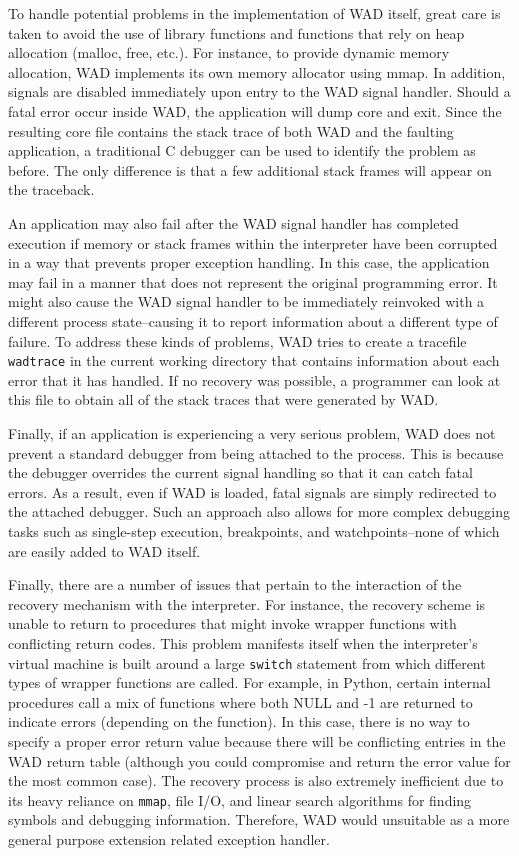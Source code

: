 To handle potential problems in the implementation of WAD itself,
great care is taken to avoid the use of library functions and
functions that rely on heap allocation (malloc, free, etc.).  For
instance, to provide dynamic memory allocation, WAD implements its own
memory allocator using mmap.  In addition, signals are disabled
immediately upon entry to the WAD signal handler.  Should a fatal
error occur inside WAD, the application will dump core and exit.  Since
the resulting core file contains the stack trace of both WAD and the
faulting application, a traditional C debugger can be used to identify
the problem as before.  The only difference is that a few additional
stack frames will appear on the traceback.

An application may also fail after the WAD signal handler has completed
execution if memory or stack frames within the interpreter have been
corrupted in a way that prevents proper exception handling. In this case, the
application may fail in a manner that does not represent the original
programming error. It might also cause the WAD signal handler to be
immediately reinvoked with a different process state--causing it to
report information about a different type of failure.  To address
these kinds of problems, WAD tries to create a tracefile {\tt
wadtrace} in the current working directory that contains information
about each error that it has handled.  If no recovery was possible, a
programmer can look at this file to obtain all of the stack traces
that were generated by WAD.

Finally, if an application is experiencing a very serious problem, WAD
does not prevent a standard debugger from being attached to the
process.  This is because the debugger overrides the current signal
handling so that it can catch fatal errors.  As a result, even if WAD
is loaded, fatal signals are simply redirected to the attached
debugger.  Such an approach also allows for more complex debugging
tasks such as single-step execution, breakpoints, and
watchpoints--none of which are easily added to WAD itself.

%
%

Finally, there are a number of issues that pertain
to the interaction of the recovery mechanism with the interpreter.
For instance, the recovery scheme is unable to return to procedures
that might invoke wrapper functions with conflicting return codes.
This problem manifests itself when the interpreter's virtual
machine is built around a large {\tt switch} statement from which different
types of wrapper functions are called.  For example, in Python, certain
internal procedures call a mix of functions where both NULL and -1 are
returned to indicate errors (depending on the function).  In this case, there
is no way to specify a proper error return value because there will be
conflicting entries in the WAD return table (although you could compromise and
return the error value for the most common case).   The recovery
process is also extremely inefficient due to its heavy reliance on
{\tt mmap}, file I/O, and linear search algorithms for finding symbols
and debugging information.  Therefore, WAD would 
unsuitable as a more general purpose extension related exception handler.

